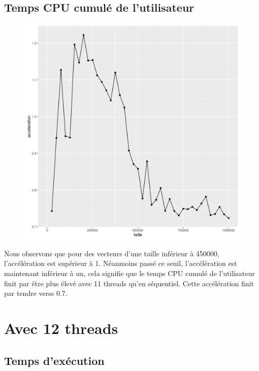 \documentclass[a4paper,11pt]{scrartcl}
\begin{document}
\subsection{Temps CPU cumul\'e de l'utilisateur}
\begin{figure}[H] \center
   \includegraphics[scale=0.5] {graphes/temps_user_accel11.png}
\end{figure}
Nous observons que pour des vecteurs d'une taille inf\'erieur \`a 450000, l'acc\'el\'eration est sup\'erieur \`a 1. N\'eanmoins pass\'e ce seuil,  l'acc\'el\'eration est maintenant inf\'erieur \`a un, cela signifie que le temps CPU cumul\'e de l'utilisateur finit par \^{e}tre plus \'elev\'e avec 11 threads qu'en s\'equentiel. Cette acc\'el\'eration finit par tendre verss 0.7.


\section{Avec 12 threads}
\subsection{Temps d'ex\'ecution}
\end{document}
